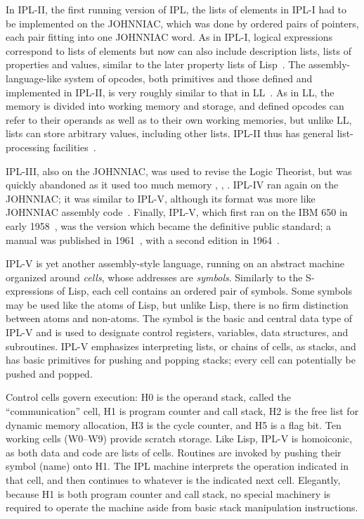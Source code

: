 \documentclass[journal]{IEEEtran}
\begin{document}
In IPL-II, the first running version of IPL, the lists of elements
in IPL-I had to be implemented on the JOHNNIAC, which was done by ordered pairs
of pointers, each pair fitting into one JOHNNIAC word.
As in IPL-I, logical expressions correspond to
lists of elements but now can also include description lists,
lists of properties and values, similar to the later property
lists of Lisp~\cite{newellshaw1957}.  The assembly-language-like system of opcodes,
both primitives and those defined and implemented in IPL-II,
is very roughly similar to that in LL~\cite{notes1957}.
As in LL, the memory is
divided into working memory and storage, and defined opcodes
can refer to their operands as well as to their own working
memories, but unlike LL, lists can store arbitrary values,
including other lists.  IPL-II thus has general list-processing
facilities~\cite{newellshaw1957}.

IPL-III, also on the JOHNNIAC, was used to
revise the Logic Theorist, but was quickly abandoned
as it used too much memory
\cite[p.~xxi]{newell1964ipl}, \cite[p.~II-18]{cip16june1958},
\cite{cip61957}.
IPL-IV ran again on the JOHNNIAC; it was similar to IPL-V,
although its format was more like JOHNNIAC assembly code~\cite{cip16june1958}.
Finally, IPL-V, which first ran on the IBM 650 in early 1958~\cite{DOC1963,iplv1986},
was the version which became the definitive public standard; a manual
was published in 1961~\cite{newell1961ipl}, with a second edition in
1964~\cite{newell1964ipl}.

IPL-V is yet another assembly-style language, running on an abstract machine
organized around \textit{cells}, whose addresses are \textit{symbols}.
Similarly to the S-expressions of Lisp, each cell contains an ordered pair of 
symbols.  Some symbols may be used like the atoms of Lisp, but unlike
Lisp, there is no firm distinction between atoms and non-atoms.
The symbol is the basic and central data type of IPL-V
and is used to designate control registers, variables, data structures,
and subroutines.
IPL-V emphasizes interpreting lists, or chains of cells,
as stacks, and has basic primitives for pushing and popping stacks;
every cell can potentially be pushed and popped.

Control cells
govern execution: H0 is the operand stack, called the
``communication'' cell, H1 is program counter and call
stack, H2 is the free list for dynamic memory allocation, H3 is
the cycle counter, and H5 is a flag bit. Ten working cells (W0--W9)
provide scratch storage. Like Lisp, IPL-V is homoiconic, as both
data and code are lists of cells. 
Routines
are invoked by pushing their symbol (name) onto H1. The IPL machine
interprets the operation indicated in that cell, and then continues to
whatever is the indicated next cell. Elegantly, because H1 is both
program counter and call stack, no special machinery is required to
operate the machine aside from basic stack manipulation instructions.
\end{document}

